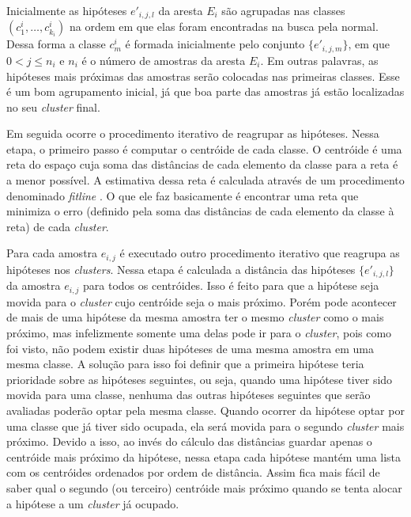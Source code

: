 
Inicialmente as hipóteses $e'_{i,j,l}$ da aresta $E_i$ são agrupadas nas classes $(c^i_1, \dots, c^i_{k_i})$ na ordem em que elas foram encontradas na busca pela normal. Dessa forma a classe $c^i_m$ é formada inicialmente pelo conjunto $\{e'_{i,j,m}\}$, em que $0 < j \leq n_i$ e $n_i$ é o número de amostras da aresta $E_i$. Em outras palavras, as hipóteses mais próximas das amostras serão colocadas nas primeiras classes. Esse é um bom agrupamento inicial, já que boa parte das amostras já estão localizadas no seu \emph{cluster} final.

Em seguida ocorre o procedimento iterativo de reagrupar as hipóteses. Nessa etapa, o primeiro passo é computar o centróide de cada classe. O centróide é uma reta do espaço cuja soma das distâncias de cada elemento da classe para a reta é a menor possível. A estimativa dessa reta é calculada através de um procedimento denominado \emph{fitline} \cite{fitline_doc}. O que ele faz basicamente é encontrar uma reta que minimiza o erro (definido pela soma das distâncias de cada elemento da classe à reta) de cada \emph{cluster}.

Para cada amostra $e_{i,j}$ é executado outro procedimento iterativo que reagrupa as hipóteses nos \emph{clusters}. Nessa etapa é calculada a distância das hipóteses $\{e'_{i,j,l}\}$ da amostra $e_{i,j}$ para todos os centróides. Isso é feito para que a hipótese seja movida para o \emph{cluster} cujo centróide seja o mais próximo. Porém pode acontecer de mais de uma hipótese da mesma amostra ter o mesmo \emph{cluster} como o mais próximo, mas infelizmente somente uma delas pode ir para o \emph{cluster}, pois como foi visto, não podem existir duas hipóteses de uma mesma amostra em uma mesma classe. A solução para isso foi definir que a primeira hipótese teria prioridade sobre as hipóteses seguintes, ou seja, quando uma hipótese tiver sido movida para uma classe, nenhuma das outras hipóteses seguintes que serão avaliadas poderão optar pela mesma classe. Quando ocorrer da hipótese optar por uma classe que já tiver sido ocupada, ela será movida para o segundo \emph{cluster} mais próximo. Devido a isso, ao invés do cálculo das distâncias guardar apenas o centróide mais próximo da hipótese, nessa etapa cada hipótese mantém uma lista com os centróides ordenados por ordem de distância. Assim fica mais fácil de saber qual o segundo (ou terceiro) centróide mais próximo quando se tenta alocar a hipótese a um \emph{cluster} já ocupado.


